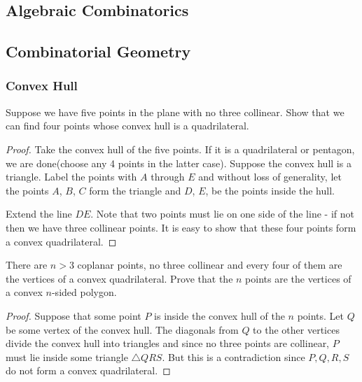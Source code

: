 \documentclass[11pt]{article}
\renewcommand{\>}{\rangle}
\newcommand{\<}{\langle}
\begin{document}


\subsection{Algebraic Combinatorics}

\subsection{Combinatorial Geometry}
\subsubsection{Convex Hull}
\begin{problem} Suppose we have five points in the plane with no three collinear.  Show that we can find four points whose convex hull is a quadrilateral.
\end{problem}
\begin{proof}
Take the convex hull of the five points.  If it is a quadrilateral or pentagon, we are done(choose any 4 points in the latter case).  Suppose the convex hull is a triangle.  Label the points with $A$ through $E$ and without loss of generality, let the points $A$, $B$, $C$ form the triangle and $D$, $E$, be the points inside the hull.

Extend the line $DE$.  Note that two points must lie on one side of the line - if not then we have three collinear points.  It is easy to show that these four points form a convex quadrilateral. 
\end{proof}
\begin{problem} There are $n > 3$ coplanar points, no three collinear and every four of them are the vertices of a convex quadrilateral.  Prove that the $n$ points are the vertices of a convex $n$-sided polygon.
\end{problem}
\begin{proof}
Suppose that some point $P$ is inside the convex hull of the $n$ points.  Let $Q$ be some vertex of the convex hull.  The diagonals from $Q$ to the other vertices divide the convex hull into triangles and since no three points are collinear, $P$ must lie inside some triangle $\triangle QRS$.  But this is a contradiction since $P, Q, R, S$ do not form a convex quadrilateral.
\end{proof}
\end{document}
